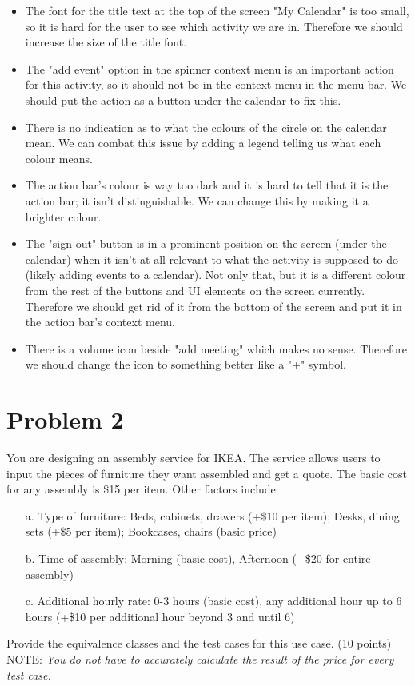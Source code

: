 \documentclass[12pt]{book}
\begin{document}
\begin{itemize}
    \item The font for the title text at the top of the screen "My Calendar" is too small, so it is hard for the user to see which activity we are in. Therefore we should increase the size of the title font.
    \item The "add event" option in the spinner context menu is an important action for this activity, so it should not be in the context menu in the menu bar. We should put the action as a button under the calendar to fix this.
    \item There is no indication as to what the colours of the circle on the calendar mean. We can combat this issue by adding a legend telling us what each colour means.
    \item The action bar's colour is way too dark and it is hard to tell that it is the action bar; it isn't distinguishable. We can change this by making it a brighter colour.
    \item The "sign out" button is in a prominent position on the screen (under the calendar) when it isn't at all relevant to what the activity is supposed to do (likely adding events to a calendar). Not only that, but it is a different colour from the rest of the buttons and UI elements on the screen currently. Therefore we should get rid of it from the bottom of the screen and put it in the action bar's context menu.
    \item There is a volume icon beside "add meeting" which makes no sense. Therefore we should change the icon to something better like a "+" symbol.
\end{itemize}


\section*{Problem 2}
You are designing an assembly service for IKEA. The service allows users to input the pieces of furniture they want assembled and get a quote. The basic cost for any assembly is \$15 per item. Other factors include:
\begin{itemize}
    \item[a.] Type of furniture: Beds, cabinets, drawers (+\$10 per item); Desks, dining sets (+\$5 per item); Bookcases, chairs (basic price) 
    \item[b.] Time of assembly: Morning (basic cost), Afternoon (+\$20 for entire assembly) 
    \item[c.] Additional hourly rate: 0-3 hours (basic cost), any additional hour up to 6 hours (+\$10 per additional hour beyond 3 and until 6)
\end{itemize}
Provide the equivalence classes and the test cases for this use case. (10 points)
NOTE: \textit{You do not have to accurately calculate the result of the price for every test case.}
\end{document}
